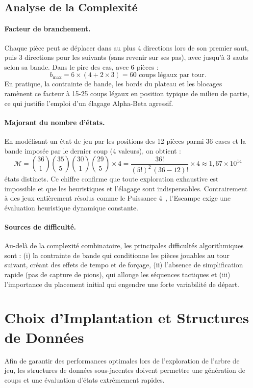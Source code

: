 \documentclass[12pt,a4paper]{article}
\begin{document}
\subsection{Analyse de la Complexité}
\paragraph{Facteur de branchement.}
Chaque pièce peut se déplacer dans au plus 4 directions lors de son premier saut, puis 3 directions pour les suivants (sans revenir sur ses pas), avec jusqu'à 3 sauts selon sa bande. Dans le pire des cas, avec 6 pièces :
\[
b_{\max} = 6 \times (4 + 2 \times 3) = 60 \text{ coups légaux par tour.}
\]
En pratique, la contrainte de bande, les bords du plateau et les blocages ramènent ce facteur à 15-25 coups légaux en position typique de milieu de partie, ce qui justifie l'emploi d'un élagage Alpha-Beta agressif.

\paragraph{Majorant du nombre d'états.}
En modélisant un état de jeu par les positions des 12 pièces parmi 36 cases et la bande imposée par le dernier coup (4 valeurs), on obtient :
\[
\mathcal{M} = \binom{36}{1}\binom{35}{5}\binom{30}{1}\binom{29}{5} \times 4 = \frac{36!}{(5!)^2\,(36-12)!} \times 4 \approx 1{,}67 \times 10^{14}
\]
états distincts. Ce chiffre confirme que toute exploration exhaustive est impossible et que les heuristiques et l'élagage sont indispensables. Contrairement à des jeux entièrement résolus comme le Puissance 4~\cite{connect4_solve}, l'Escampe exige une évaluation heuristique dynamique constante.

\paragraph{Sources de difficulté.}
Au-delà de la complexité combinatoire, les principales difficultés algorithmiques sont : (i) la contrainte de bande qui conditionne les pièces jouables au tour suivant, créant des effets de tempo et de forçage, (ii) l'absence de simplification rapide (pas de capture de pions), qui allonge les séquences tactiques et (iii) l'importance du placement initial qui engendre une forte variabilité de départ.





\section{Choix d'Implantation et Structures de Données}
Afin de garantir des performances optimales lors de l'exploration de l'arbre de jeu, les structures de données sous-jacentes doivent permettre une génération de coups et une évaluation d'états extrêmement rapides.
\end{document}
